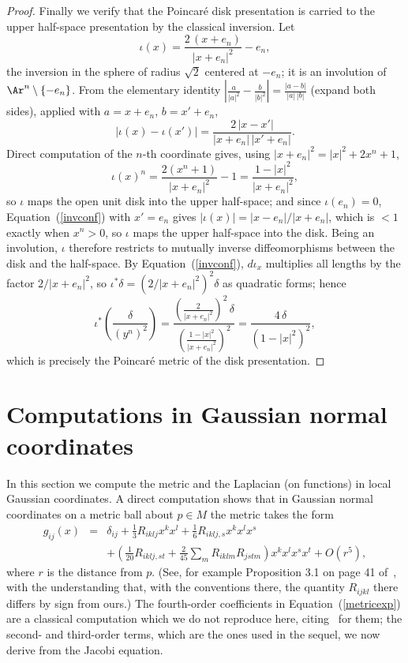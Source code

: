\begin{proof}
Finally we verify that the Poincar\'e disk presentation is carried
to the upper half-space presentation by the classical inversion.
Let
$$\iota(x)=\frac{2\,(x+e_n)}{|x+e_n|^2}-e_n,$$
the inversion in the sphere of radius $\sqrt2$ centered at $-e_n$;
it is an involution of $\Ar^n\setminus\{-e_n\}$. From the
elementary identity
$\left|\frac{a}{|a|^2}-\frac{b}{|b|^2}\right|=\frac{|a-b|}{|a|\,|b|}$
(expand both sides), applied with $a=x+e_n$, $b=x'+e_n$,
\begin{equation}\label{invconf}
|\iota(x)-\iota(x')|
=\frac{2\,|x-x'|}{|x+e_n|\,|x'+e_n|}.
\end{equation}
Direct computation of the $n$-th coordinate gives, using
$|x+e_n|^2=|x|^2+2x^n+1$,
$$\iota(x)^n=\frac{2(x^n+1)}{|x+e_n|^2}-1
=\frac{1-|x|^2}{|x+e_n|^2},$$
so $\iota$ maps the open unit disk into the upper half-space; and
since $\iota(e_n)=0$, Equation~(\ref{invconf}) with $x'=e_n$ gives
$|\iota(x)|=|x-e_n|/|x+e_n|$, which is $<1$ exactly when $x^n>0$,
so $\iota$ maps the upper half-space into the disk. Being an
involution, $\iota$ therefore restricts to mutually inverse
diffeomorphisms between the disk and the half-space. By
Equation~(\ref{invconf}), $d\iota_x$ multiplies all lengths by the
factor $2/|x+e_n|^2$, so $\iota^*\delta=
\left(2/|x+e_n|^2\right)^2\delta$ as quadratic forms; hence
$$\iota^*\left(\frac{\delta}{(y^n)^2}\right)
=\frac{\left(\frac{2}{|x+e_n|^2}\right)^2\,\delta}
{\left(\frac{1-|x|^2}{|x+e_n|^2}\right)^2}
=\frac{4\,\delta}{\left(1-|x|^2\right)^2},$$
which is precisely the Poincar\'e metric of the disk presentation.
\end{proof}

\section{Computations in Gaussian normal coordinates}

In this section we compute the metric and the Laplacian (on
functions) in local Gaussian coordinates. A direct computation shows
that in Gaussian normal coordinates on a metric ball about $p\in M$
the metric takes the form
\begin{eqnarray}\label{metricexp}
g_{ij}(x)& = & \delta_{ij} + \frac{1}{3}R_{iklj}x^kx^l +
\frac{1}{6}R_{iklj,s}x^kx^lx^s \\
& & +(\frac{1}{20}R_{iklj,st} +\frac{2}{45}\sum_m
R_{iklm}R_{jstm})x^kx^lx^sx^t + O(r^{5}), \nonumber
\end{eqnarray}
where $r$ is the distance from $p$. (See, for example Proposition
3.1 on page 41 of~\cite{Sakai}, with the understanding that, with
the conventions there, the quantity $R_{ijkl}$ there differs by sign
from ours.) The fourth-order coefficients in
Equation~(\ref{metricexp}) are a classical computation which we do
not reproduce here, citing~\cite{Sakai} for them; the second- and
third-order terms, which are the ones used in the sequel, we now
derive from the Jacobi equation.

